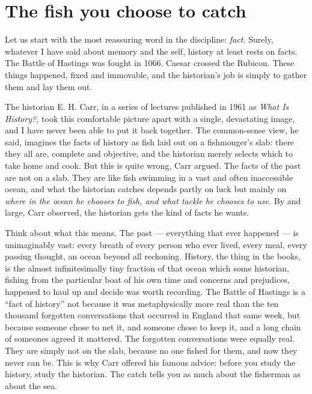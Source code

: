 \section*{The fish you choose to catch}

Let us start with the most reassuring word in the discipline: \emph{fact.} Surely, whatever I have said about memory and the self, history at least rests on facts. The Battle of Hastings was fought in 1066. Caesar crossed the Rubicon. These things happened, fixed and immovable, and the historian's job is simply to gather them and lay them out.

The historian E. H. Carr, in a series of lectures published in 1961 as \emph{What Is History?,} took this comfortable picture apart with a single, devastating image, and I have never been able to put it back together. The common-sense view, he said, imagines the facts of history as fish laid out on a fishmonger's slab: there they all are, complete and objective, and the historian merely selects which to take home and cook. But this is quite wrong, Carr argued. The facts of the past are not on a slab. They are like fish swimming in a vast and often inaccessible ocean, and what the historian catches depends partly on luck but mainly on \emph{where in the ocean he chooses to fish, and what tackle he chooses to use.} By and large, Carr observed, the historian gets the kind of facts he wants.

Think about what this means. The past — everything that ever happened — is unimaginably vast: every breath of every person who ever lived, every meal, every passing thought, an ocean beyond all reckoning. History, the thing in the books, is the almost infinitesimally tiny fraction of that ocean which some historian, fishing from the particular boat of his own time and concerns and prejudices, happened to haul up and decide was worth recording. The Battle of Hastings is a ``fact of history'' not because it was metaphysically more real than the ten thousand forgotten conversations that occurred in England that same week, but because someone chose to net it, and someone chose to keep it, and a long chain of someones agreed it mattered. The forgotten conversations were equally real. They are simply not on the slab, because no one fished for them, and now they never can be. This is why Carr offered his famous advice: before you study the history, study the historian. The catch tells you as much about the fisherman as about the sea.

